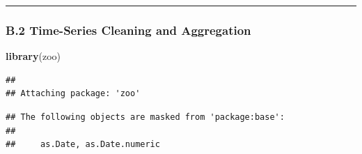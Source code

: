 \documentclass[
]{article}
\newenvironment{Shaded}{\begin{snugshade}}{\end{snugshade}}
\newcommand{\FunctionTok}[1]{\textcolor[rgb]{0.13,0.29,0.53}{\textbf{#1}}}
\newcommand{\NormalTok}[1]{#1}
\begin{document}
\begin{center}\rule{0.5\linewidth}{0.5pt}\end{center}

\subsubsection{B.2 Time-Series Cleaning and
Aggregation}\label{b.2-time-series-cleaning-and-aggregation}

\begin{Shaded}
\begin{Highlighting}[]
\FunctionTok{library}\NormalTok{(zoo)}
\end{Highlighting}
\end{Shaded}

\begin{verbatim}
## 
## Attaching package: 'zoo'
\end{verbatim}

\begin{verbatim}
## The following objects are masked from 'package:base':
## 
##     as.Date, as.Date.numeric
\end{verbatim}
\end{document}
